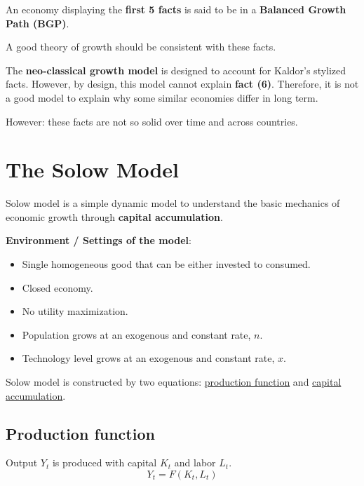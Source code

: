 An economy displaying the \textbf{first 5 facts} is said to be in a \textbf{Balanced Growth Path (BGP)}.

A good theory of growth should be consistent with these facts.

The \textbf{neo-classical growth model} is designed to account for Kaldor's stylized facts. However, by design, this model cannot explain \textbf{fact (6)}. Therefore, it is not a good model to explain why some similar economies differ in long term.

\begin{remark*} However:
    these facts are not so solid over time and across countries.
\end{remark*}

\section{The Solow Model}

Solow model is a simple dynamic model to understand the basic mechanics of economic growth through \textbf{capital accumulation}.

\textbf{Environment / Settings of the model}: \begin{itemize}
    \item Single homogeneous good that can be either invested to consumed.
    \item Closed economy.
    \item No utility maximization.
    \item Population grows at an exogenous and constant rate, $n$.
    \item Technology level grows at an exogenous and constant rate, $x$.
\end{itemize}

Solow model is constructed by two equations: \underline{production function} and \underline{capital accumulation}.

\subsection{Production function} Output $Y_t$ is produced with capital $K_t$ and labor $L_t$.
\[
    Y_t = F(K_t, L_t)
\]

